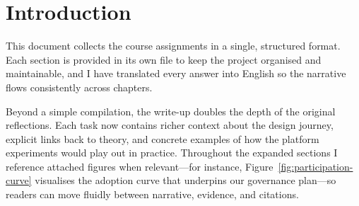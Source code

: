 \documentclass[12pt,a4paper]{article}
\begin{document}
\setcounter{secnumdepth}{-1}
\makeatletter
\renewcommand{\numberline}[1]{}
\makeatother

\tableofcontents
\newpage

\section*{Introduction}
This document collects the course assignments in a single, structured format. Each section is provided in its own file to keep the project organised and maintainable, and I have translated every answer into English so the narrative flows consistently across chapters.

Beyond a simple compilation, the write-up doubles the depth of the original reflections. Each task now contains richer context about the design journey, explicit links back to theory, and concrete examples of how the platform experiments would play out in practice. Throughout the expanded sections I reference attached figures when relevant---for instance, Figure~\ref{fig:participation-curve} visualises the adoption curve that underpins our governance plan---so readers can move fluidly between narrative, evidence, and citations.












\newpage


\end{document}

